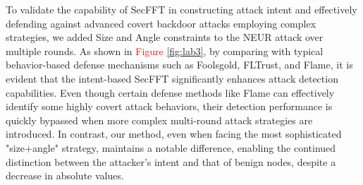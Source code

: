 \documentclass[lettersize,journal]{IEEEtran}
\begin{document}
To validate the capability of SecFFT in constructing attack intent and effectively defending against advanced covert backdoor attacks employing complex strategies, we added Size and Angle constraints to the NEUR attack over multiple rounds. As shown in \textcolor{red}{Figure \ref{fig:lab3}}, by comparing with typical behavior-based defense mechanisms such as Foolsgold, FLTrust, and Flame, it is evident that the intent-based SecFFT significantly enhances attack detection capabilities. Even though certain defense methods like Flame can effectively identify some highly covert attack behaviors, their detection performance is quickly bypassed when more complex multi-round attack strategies are introduced. In contrast, our method, even when facing the most sophisticated "size+angle" strategy, maintains a notable difference, enabling the continued distinction between the attacker's intent and that of benign nodes, despite a decrease in absolute values.

\end{document}
